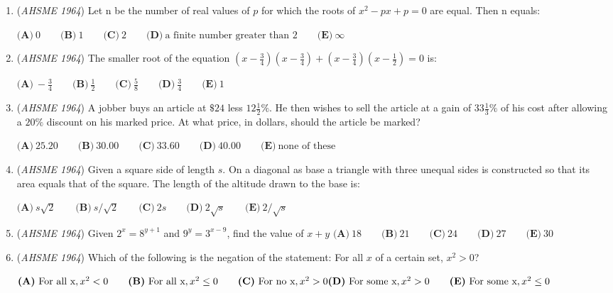 \begin{enumerate}
 $\textbf{(A)}\ -27 \qquad \textbf{(B)}\ -13\frac{1}{2} \qquad \textbf{(C)}\ 12\qquad \textbf{(D)}\ 13\frac{1}{2}\qquad \textbf{(E)}\ 27$


	\item (\textit{AHSME 1964}) Let n be the number of real values of $p$ for which the roots of 
$x^2-px+p=0$
are equal. Then n equals:


 $\textbf{(A)}\ 0 \qquad \textbf{(B)}\ 1 \qquad \textbf{(C)}\ 2 \qquad \textbf{(D)}\ \text{a finite number greater than 2}\qquad \textbf{(E)}\ \infty$


	\item (\textit{AHSME 1964}) The smaller root of the equation 
$\left(x-\frac{3}{4}\right)\left(x-\frac{3}{4}\right)+\left(x-\frac{3}{4}\right)\left(x-\frac{1}{2}\right) =0$ is:


 $\textbf{(A)}\ -\frac{3}{4}\qquad \textbf{(B)}\ \frac{1}{2}\qquad \textbf{(C)}\ \frac{5}{8}\qquad \textbf{(D)}\ \frac{3}{4}\qquad \textbf{(E)}\ 1$


	\item (\textit{AHSME 1964}) A jobber buys an article at $\$24$ less $12\frac{1}{2}\%$. He then wishes to sell the article at a gain of $33\frac{1}{3}\%$ of his cost 
after allowing a $20\%$ discount on his marked price. At what price, in dollars, should the article be marked?


 $\textbf{(A)}\ 25.20 \qquad \textbf{(B)}\ 30.00 \qquad \textbf{(C)}\ 33.60 \qquad \textbf{(D)}\ 40.00 \qquad \textbf{(E)}\ \text{none of these}$


	\item (\textit{AHSME 1964}) Given a square side of length $s$. On a diagonal as base a triangle with three unequal sides is constructed so that its area
equals that of the square. The length of the altitude drawn to the base is:


 $\textbf{(A)}\ s\sqrt{2} \qquad \textbf{(B)}\ s/\sqrt{2} \qquad \textbf{(C)}\ 2s \qquad \textbf{(D)}\ 2\sqrt{s} \qquad \textbf{(E)}\ 2/\sqrt{s}$


	\item (\textit{AHSME 1964}) Given $2^x=8^{y+1}$ and $9^y=3^{x-9}$, find the value of $x+y$
$\textbf{(A)}\ 18 \qquad \textbf{(B)}\ 21 \qquad \textbf{(C)}\ 24 \qquad \textbf{(D)}\ 27 \qquad \textbf{(E)}\ 30$


	\item (\textit{AHSME 1964}) Which of the following is the negation of the statement: For all $x$ of a certain set, $x^2>0$?


 $\textbf{(A)}\ \text{For all x}, x^2 < 0\qquad \textbf{(B)}\ \text{For all x}, x^2 \le 0\qquad \textbf{(C)}\ \text{For no x}, x^2>0\qquad \\ \textbf{(D)}\ \text{For some x}, x^2>0\qquad \textbf{(E)}\ \text{For some x}, x^2 \le 0$



\end{enumerate}

